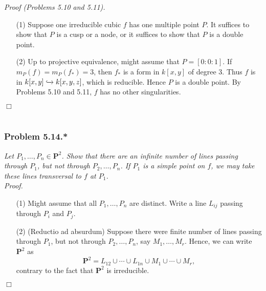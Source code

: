 \documentclass{article}
\begin{document}
\emph{Proof (Problems 5.10 and 5.11).}
\begin{enumerate}
\item[(1)]
  Suppose one irreducible cubic $f$ has one multiple point $P$.
  It suffices to show that $P$ is a cusp or a node,
  or it suffices to show that $P$ is a double point.

\item[(2)]
  Up to projective equivalence, might assume that $P = [0:0:1]$.
  If $m_P(f) = m_P(f_{*}) = 3$, then $f_{*}$ is a form in $k[x,y]$ of degree $3$.
  Thus $f$ is in $k[x,y] \xhookrightarrow{} k[x,y,z]$, which is reducible.
  Hence $P$ is a double point.
  By Problems 5.10 and 5.11, $f$ has no other singularities.
\end{enumerate}
$\Box$ \\\\






\subsubsection*{Problem 5.14.*}
\emph{Let $P_1,\ldots,P_n \in \mathbf{P}^{2}$.
Show that there are an infinite number of lines passing through $P_1$,
but not through $P_2, \ldots, P_n$.
If $P_1$ is a simple point on $f$,
we may take these lines transversal to $f$ at $P_1$.} \\



\emph{Proof.}
\begin{enumerate}
\item[(1)]
  Might assume that all $P_1,\ldots,P_n$ are distinct.
  Write a line $L_{ij}$ passing through $P_i$ and $P_j$.

\item[(2)]
  (Reductio ad absurdum)
  Suppose there were finite number of lines passing through $P_1$,
  but not through $P_2, \ldots, P_n$, say $M_1, \ldots, M_r$.
  Hence, we can write $\mathbf{P}^{2}$ as
  \[
    \mathbf{P}^{2}
    =
    L_{12} \cup \cdots \cup L_{1n} \cup M_1 \cup \cdots \cup M_r,
  \]
  contrary to the fact that $\mathbf{P}^{2}$ is irreducible.
\end{enumerate}
$\Box$ \\\\
\end{document}
